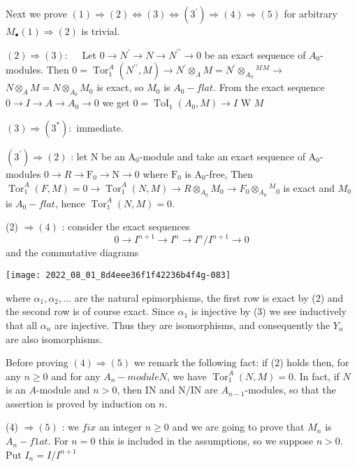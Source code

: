 Next we prove $(1) \Rightarrow(2) \Leftrightarrow(3) \Leftrightarrow\left(3^{\prime}\right) \Rightarrow(4) \Rightarrow(5)$ for arbitrary $M_{\bullet}(1) \Rightarrow(2)$ is trivial.

$(2) \Rightarrow(3): \quad$ Let $0 \rightarrow N^{\prime} \rightarrow N \rightarrow N^{\prime \prime} \rightarrow 0$ be an exact sequence of $A_{0}$-modules. Then $0=\operatorname{Tor}_{1}^{A}\left(N^{\prime \prime}, M\right) \rightarrow N^{\prime} \otimes_{A} M=N^{\prime} \otimes_{A_{0}}{ }^{M}{ }^{M} \rightarrow$ $N \otimes_{A} M=N \otimes_{A_{0}} M_{0}$ is exact, so $M_{0}$ is $A_{0}-f l a t$. From the exact sequence $0 \rightarrow I \rightarrow A \rightarrow A_{0} \rightarrow 0$ we get $0=\operatorname{ToI}_{1}\left(A_{0}, M\right) \rightarrow I$ W $M$

$(3) \Rightarrow\left(3^{*}\right):$ immediate.

$\left(3^{\prime}\right) \Rightarrow(2)$ : let $\mathrm{N}$ be an $\mathrm{A}_{0}$-module and take an exact sequence of $\mathrm{A}_{0}$-modules $0 \rightarrow R \rightarrow \mathrm{F}_{0} \rightarrow \mathrm{N} \rightarrow 0$ where $\mathrm{F}_{0}$ is $\mathrm{A}_{0}$-free, Then $\operatorname{Tor}_{1}^{A}(F, M)=0 \rightarrow \operatorname{Tor}_{1}^{A}(N, M) \rightarrow R \otimes_{A_{0}} M_{0} \rightarrow F_{0} \otimes_{A_{0}}{ }^{M}{ }_{0}$ is exact and $M_{0}$ is $A_{0}-f l a t$, hence $\operatorname{Tor}_{1}^{A}(N, M)=0$.

(2) $\Rightarrow(4)$ : consider the exact sequences
$$
0 \rightarrow I^{n+1} \rightarrow I^{n} \rightarrow I^{n} / I^{n+1} \rightarrow 0
$$
and the commutative diagrams

\texttt{[image: 2022\_08\_01\_8d4eee36f1f42236b4f4g-083]}

where $\alpha_{1}, \alpha_{2}, \ldots$ are the natural epimorphisms, the first row is exact by (2) and the second row is of course exact. Since $\alpha_{1}$ is injective by (3) we see inductively that all $\alpha_{n}$ are injective. Thus they are isomorphisms, and consequently the $Y_{n}$ are also isomorphisms.

Before proving $(4) \Rightarrow(5)$ we remark the following fact: if (2) holds then, for any $n \geqslant 0$ and for any $A_{n}-m o d u l e N$, we have $\operatorname{Tor}_{1}^{A}(N, M)=0$. In fact, if $N$ is an $A$-module and $n>0$, then IN and N/IN are $A_{n-1}$-modules, so that the assertion is proved by induction on $n$.

(4) $\Rightarrow(5)$ : we $f i x$ an integer $n \geqslant 0$ and we are going to prove that $M_{n}$ is $A_{n}-f 1 a t$. For $n=0$ this is included in the assumptions, so we suppose $n>0$. Put $I_{n}=I / I^{n+1}$

